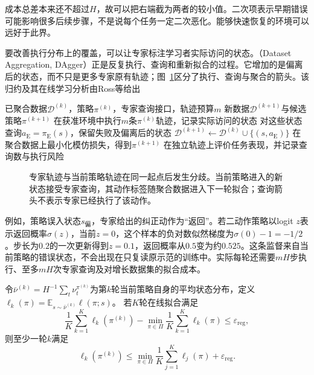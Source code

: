 成本总差本来还不超过$H$，故可以把右端截为两者的较小值。二次项表示早期错误可能影响很多后续步骤，不是说每个任务一定二次恶化。能够快速恢复的环境可以远好于此界。

要改善执行分布上的覆盖，可以让专家标注学习者实际访问的状态。（Dataset Aggregation, DAgger）正是反复执行、查询和重新拟合的过程。它增加的是偏离后的状态，而不只是更多专家原有轨迹；图~\ref{fig:rl-reward-dagger}区分了执行、查询与聚合的箭头。该归约及其在线学习分析由Ross等给出

\begin{algorithm}[一轮DAgger更新]
  \label{alg:rl-reward-dagger}
  \begin{algorithmic}[1]
    \Require 已聚合数据$\mathcal D^{(k)}$，策略$\pi^{(k)}$，专家查询接口，轨迹预算$m$
    \Ensure 新数据$\mathcal D^{(k+1)}$与候选策略$\pi^{(k+1)}$
    \State 在获准环境中执行$m$条$\pi^{(k)}$轨迹，记录实际访问的状态
    \State 对这些状态查询$a_{\mathrm E}=\pi_{\mathrm E}(s)$，保留失败及偏离后的状态
    \State $\mathcal D^{(k+1)}\gets\mathcal D^{(k)}\cup\{(s,a_{\mathrm E})\}$
    \State 在聚合数据上最小化模仿损失，得到$\pi^{(k+1)}$
    \State 在独立轨迹上评价任务表现，并记录查询数与执行风险
  \end{algorithmic}
\end{algorithm}

\begin{figure}[htbp]
  \centering
  
  \caption{专家轨迹与当前策略轨迹在同一起点后发生分歧。当前策略进入的新状态接受专家查询，其动作标签随聚合数据进入下一轮拟合；查询箭头不表示专家已经执行了该动作。}
  \label{fig:rl-reward-dagger}
\end{figure}

例如，策略误入状态$s_{\text{偏}}$，专家给出的纠正动作为“返回”。若二动作策略以logit $z$表示返回概率$\sigma(z)$，当前$z=0$，这个样本的负对数似然梯度为$\sigma(0)-1=-1/2$。步长为$0.2$的一次更新得到$z=0.1$，返回概率从$0.5$变为约$0.525$。这条监督来自当前策略的错误状态，不会出现在只复读原示范的训练中。实际每轮还需要$mH$步执行、至多$mH$次专家查询及对增长数据集的拟合成本。

\begin{theorem}[理想化DAgger的无遗憾归约]
  \label{thm:rl-reward-dagger}
  令$\bar\nu^{(k)}=H^{-1}\sum_t\nu_t^{\pi^{(k)}}$为第$k$轮当前策略自身的平均状态分布，定义
  $\ell_k(\pi)=\mathbb E_{s\sim\bar\nu^{(k)}}\ell(\pi;s)$。
  若$K$轮在线拟合满足
  \[
    \frac1K\sum_{k=1}^K\ell_k(\pi^{(k)})
    -\min_{\pi\in\Pi}\frac1K\sum_{k=1}^K\ell_k(\pi)
    \leq\varepsilon_{\mathrm{reg}},
  \]
  则至少一轮$k$满足
  \[
    \ell_k(\pi^{(k)})
    \leq\min_{\pi\in\Pi}\frac1K\sum_{j=1}^K\ell_j(\pi)
        +\varepsilon_{\mathrm{reg}}.
  \]
\end{theorem}

